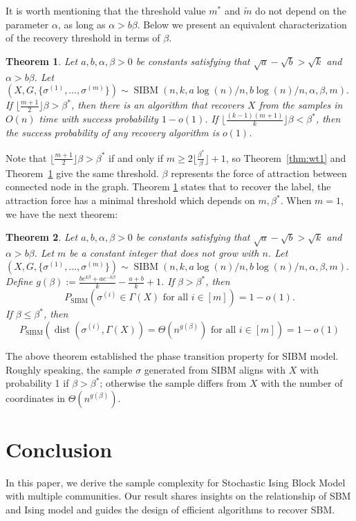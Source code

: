 \documentclass[conference]{IEEEtran}
\newtheorem{theorem}{Theorem}%
\DeclareMathOperator{\SIBM}{SIBM}
\DeclareMathOperator{\dist}{dist}
\begin{document}
It is worth mentioning that the threshold value $m^\ast$ and $\tilde{m}$ do not depend on the parameter $\alpha$, as long as $\alpha>b\beta$.
Below we present an equivalent characterization of the recovery threshold in terms of $\beta$.
\begin{theorem} \label{thm:wt2}
	Let $a,b,\alpha,\beta> 0$ be constants satisfying that $\sqrt{a}-\sqrt{b} > \sqrt{k}$ and $\alpha>b\beta$. 
	Let 
	$
	(X,G,\{\sigma^{(1)},\dots,\sigma^{(m)}\}) \sim \SIBM(n, k, a\log(n)/n, b\log(n)/n,\alpha,\beta,m).
	$
	If $\lfloor \frac{m+1}{2} \rfloor \beta>\beta^\ast$, then there is an algorithm that recovers $X$ from the samples in $O(n)$ time with success probability $1-o(1)$. If $\lfloor \frac{(k-1)(m+1)}{k} \rfloor \beta <\beta^\ast$, then the success probability of any recovery algorithm is $o(1)$. 
\end{theorem}
Note that $\lfloor \frac{m+1}{2} \rfloor \beta>\beta^\ast$ if and only if $m\ge 2 \Big\lfloor \frac{\beta^\ast}{\beta} \Big\rfloor +1$, so Theorem~\ref{thm:wt1} and Theorem~\ref{thm:wt2} give the same threshold. $\beta$ represents the force of attraction between connected node in the graph. Theorem \ref{thm:wt2} states that
to recover the label, the attraction force has a minimal threshold which depends on $m, \beta^*$.
When $m=1$, we have the next theorem:

\begin{theorem}  \label{thm:wt3}
Let $a,b,\alpha,\beta> 0$ be constants satisfying that $\sqrt{a}-\sqrt{b} > \sqrt{k}$ and $\alpha>b\beta$. Let $m$ be a constant integer that does not grow with $n$.
Let 
$
(X,G,\{\sigma^{(1)},\dots,\sigma^{(m)}\}) \sim \SIBM(n,k, a\log(n)/n, b\log(n)/n,\alpha,\beta,m).
$
Define $g(\beta)  := \frac{b e^{k\beta}+a e^{-k\beta}}{k}-\frac{a+b}{k}+1$.
If $\beta>\beta^\ast$, then
$$
P_{\SIBM}(\sigma^{(i)} \in \Gamma(X) \text{~for all~} i\in[m]) = 1-o(1).
$$
If $\beta\le \beta^\ast$, then
$$
P_{\SIBM}(\dist(\sigma^{(i)}, \Gamma(X))= \Theta(n^{g(\beta)}) \text{~for all~} i\in[m]) = 1-o(1)
$$
\end{theorem}

The above theorem established the phase transition property for SIBM model.
Roughly speaking, the sample $\sigma$ generated from SIBM aligns with $X$ with probability 1 if $\beta > \beta^*$;
otherwise the sample differs from $X$ with the number of coordinates in $\Theta(n^{g(\beta)})$.

\section{Conclusion}\label{s:conclusion}
In this paper, we derive the sample complexity for Stochastic Ising Block Model with multiple communities.
Our result shares insights on the relationship of SBM and Ising model and guides the design of efficient algorithms
to recover SBM.
\appendix
\end{document}
